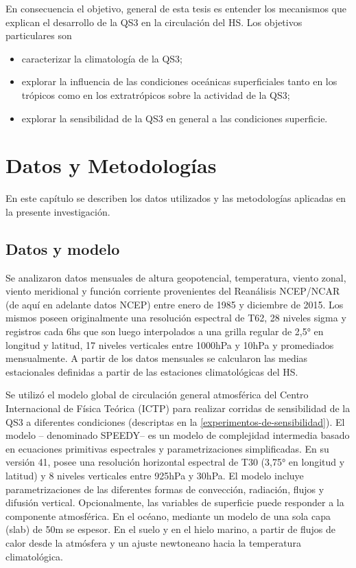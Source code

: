 \documentclass[spanish,a4paper,12pt,oneside]{book}
\providecommand{\tightlist}{%
  \setlength{\itemsep}{0pt}\setlength{\parskip}{0pt}}
\begin{document}
En consecuencia el objetivo, general de esta tesis es entender los
mecanismos que explican el desarrollo de la QS3 en la circulación del
HS. Los objetivos particulares son

\begin{itemize}
\tightlist
\item
  caracterizar la climatología de la QS3;
\item
  explorar la influencia de las condiciones oceánicas superficiales
  tanto en los trópicos como en los extratrópicos sobre la actividad de
  la QS3;
\item
  explorar la sensibilidad de la QS3 en general a las condiciones
  superficie.
\end{itemize}

\hypertarget{datos-y-metodologias}{%
\chapter{Datos y Metodologías}\label{datos-y-metodologias}}

En este capítulo se describen los datos utilizados y las metodologías
aplicadas en la presente investigación.

\hypertarget{datos-y-modelo}{%
\section{Datos y modelo}\label{datos-y-modelo}}

Se analizaron datos mensuales de altura geopotencial, temperatura,
viento zonal, viento meridional y función corriente provenientes del
Reanálisis NCEP/NCAR \citep{Kalnay1996} (de aquí en adelante datos NCEP)
entre enero de 1985 y diciembre de 2015. Los mismos poseen originalmente
una resolución espectral de T62, 28 niveles sigma y registros cada 6hs
que son luego interpolados a una grilla regular de 2,5° en longitud y
latitud, 17 niveles verticales entre 1000hPa y 10hPa y promediados
mensualmente. A partir de los datos mensuales se calcularon las medias
estacionales definidas a partir de las estaciones climatológicas del HS.

Se utilizó el modelo global de circulación general atmosférica del
Centro Internacional de Física Teórica (ICTP)
\citep{Molteni2003, Kucharski2006} para realizar corridas de
sensibilidad de la QS3 a diferentes condiciones (descriptas en la
\autoref{experimentos-de-sensibilidad}). El modelo -- denominado
SPEEDY-- es un modelo de complejidad intermedia basado en ecuaciones
primitivas espectrales y parametrizaciones simplificadas. En su versión
41, posee una resolución horizontal espectral de T30 (3,75° en longitud
y latitud) y 8 niveles verticales entre 925hPa y 30hPa. El modelo
incluye parametrizaciones de las diferentes formas de convección,
radiación, flujos y difusión vertical. Opcionalmente, las variables de
superficie puede responder a la componente atmosférica. En el océano,
mediante un modelo de una sola capa (slab) de 50m se espesor. En el
suelo y en el hielo marino, a partir de flujos de calor desde la
atmósfera y un ajuste newtoneano hacia la temperatura climatológica.
\end{document}
